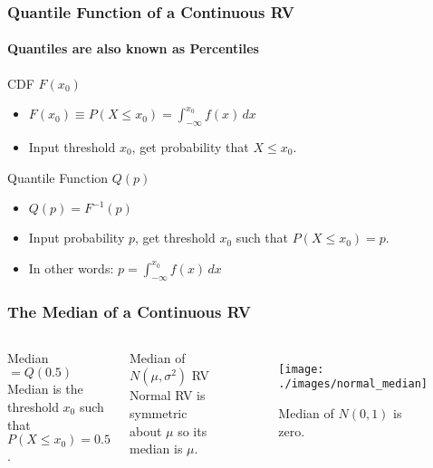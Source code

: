 \begin{frame}
\frametitle{Quantile Function of a Continuous RV}
\framesubtitle{Quantiles are also known as Percentiles}

\begin{block}{CDF $F(x_0)$}
  \begin{itemize}
    \item $\displaystyle F(x_0) \equiv P(X \leq x_0) = \int_{-\infty}^{x_0} f(x)\, dx$
    \item Input threshold $x_0$, get probability that $X \leq x_0$.
  \end{itemize}
\end{block}

\begin{alertblock}{Quantile Function $Q(p)$}
  \begin{itemize}
\item $Q(p) = F^{-1}(p)$
\item Input probability $p$, get threshold $x_0$ such that $P(X\leq x_0) = p$.
\item In other words: $\displaystyle p = \int_{-\infty}^{x_0} f(x)\, dx$ 
  \end{itemize}
\end{alertblock}

	
\end{frame}
\begin{frame}[t]
\frametitle{The Median of a Continuous RV}

\begin{columns}


\vspace{-3em}
\begin{block}{Median $= Q(0.5)$}
  Median is the threshold $x_0$ such that $P(X \leq x_0) = 0.5$. 
\end{block}

\begin{block}{Median of $N(\mu, \sigma^2)$ RV}
  Normal RV is symmetric about $\mu$ so its median is $\mu$.
\end{block}

\vspace{-3em}
\begin{figure}
\centering
\texttt{[image: ./images/normal\_median]}
\caption{Median of $N(0,1)$ is zero.}
\end{figure}

\end{columns}

\end{frame}
